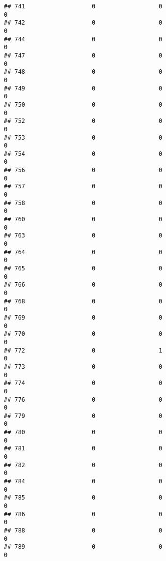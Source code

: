 \documentclass[
]{article}
\begin{document}
\begin{verbatim}
## 741                   0                  0                              0
## 742                   0                  0                              0
## 744                   0                  0                              0
## 747                   0                  0                              0
## 748                   0                  0                              0
## 749                   0                  0                              0
## 750                   0                  0                              0
## 752                   0                  0                              0
## 753                   0                  0                              0
## 754                   0                  0                              0
## 756                   0                  0                              0
## 757                   0                  0                              0
## 758                   0                  0                              0
## 760                   0                  0                              0
## 763                   0                  0                              0
## 764                   0                  0                              0
## 765                   0                  0                              0
## 766                   0                  0                              0
## 768                   0                  0                              0
## 769                   0                  0                              0
## 770                   0                  0                              0
## 772                   0                  1                              0
## 773                   0                  0                              0
## 774                   0                  0                              0
## 776                   0                  0                              0
## 779                   0                  0                              0
## 780                   0                  0                              0
## 781                   0                  0                              0
## 782                   0                  0                              0
## 784                   0                  0                              0
## 785                   0                  0                              0
## 786                   0                  0                              0
## 788                   0                  0                              0
## 789                   0                  0                              0

\end{verbatim}
\end{document}
